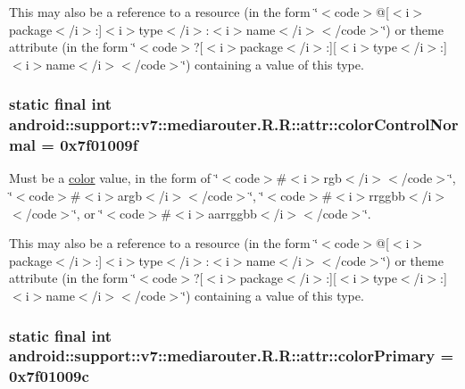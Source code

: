 This may also be a reference to a resource (in the form \char`\"{}$<$code$>$@\mbox{[}$<$i$>$package$<$/i$>$:\mbox{]}$<$i$>$type$<$/i$>$:$<$i$>$name$<$/i$>$$<$/code$>$\char`\"{}) or theme attribute (in the form \char`\"{}$<$code$>$?\mbox{[}$<$i$>$package$<$/i$>$:\mbox{]}\mbox{[}$<$i$>$type$<$/i$>$:\mbox{]}$<$i$>$name$<$/i$>$$<$/code$>$\char`\"{}) containing a value of this type. \hypertarget{classandroid_1_1support_1_1v7_1_1mediarouter_1_1_r_1_1attr_e253b7303a0631cf38fcf9fe61d5f030}{
\subsubsection[{colorControlNormal}]{\setlength{\rightskip}{0pt plus 5cm}static final int android::support::v7::mediarouter.R.R::attr::colorControlNormal = 0x7f01009f}}
\label{classandroid_1_1support_1_1v7_1_1mediarouter_1_1_r_1_1attr_e253b7303a0631cf38fcf9fe61d5f030}


Must be a \hyperlink{classandroid_1_1support_1_1v7_1_1mediarouter_1_1_r_1_1color}{color} value, in the form of \char`\"{}$<$code$>$\#$<$i$>$rgb$<$/i$>$$<$/code$>$\char`\"{}, \char`\"{}$<$code$>$\#$<$i$>$argb$<$/i$>$$<$/code$>$\char`\"{}, \char`\"{}$<$code$>$\#$<$i$>$rrggbb$<$/i$>$$<$/code$>$\char`\"{}, or \char`\"{}$<$code$>$\#$<$i$>$aarrggbb$<$/i$>$$<$/code$>$\char`\"{}. 

This may also be a reference to a resource (in the form \char`\"{}$<$code$>$@\mbox{[}$<$i$>$package$<$/i$>$:\mbox{]}$<$i$>$type$<$/i$>$:$<$i$>$name$<$/i$>$$<$/code$>$\char`\"{}) or theme attribute (in the form \char`\"{}$<$code$>$?\mbox{[}$<$i$>$package$<$/i$>$:\mbox{]}\mbox{[}$<$i$>$type$<$/i$>$:\mbox{]}$<$i$>$name$<$/i$>$$<$/code$>$\char`\"{}) containing a value of this type. \hypertarget{classandroid_1_1support_1_1v7_1_1mediarouter_1_1_r_1_1attr_475833c84dc1f1160fa8bd7b13a456ad}{
\subsubsection[{colorPrimary}]{\setlength{\rightskip}{0pt plus 5cm}static final int android::support::v7::mediarouter.R.R::attr::colorPrimary = 0x7f01009c}}
\label{classandroid_1_1support_1_1v7_1_1mediarouter_1_1_r_1_1attr_475833c84dc1f1160fa8bd7b13a456ad}


